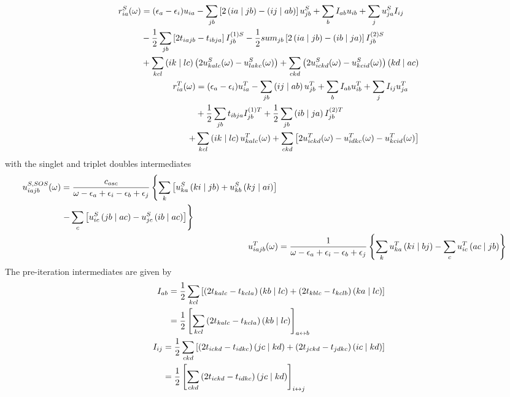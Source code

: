\begin{align}
\begin{split}
r_{ia}^S(\omega) &= (\epsilon_a - \epsilon_i) u_{ia} - \sum_{jb} \left[ 2\left( ia \mid jb \right) - \left( ij \mid ab \right) \right] u_{jb}^S + \sum_b I_{ab} u_{ib} + \sum_j u_{ja}^S I_{ij} \\
&- \frac{1}{2} \sum_{jb} \left[2t_{iajb} - t_{ibja}\right] I^{(1)S}_{jb} - \frac{1}{2} sum_{jb} \left[ 2 \left( ia \mid jb \right) - \left( ib \mid ja \right) \right] I^{(2)S}_{jb} \\
&+ \sum_{kcl} \left( ik \mid lc \right) \left( 2 u_{kalc}^S(\omega) - u_{lakc}^S(\omega) \right) + \sum_{ckd} \left( 2 u^S_{ickd}(\omega) - u^S_{kcid}(\omega) \right) \left( kd \mid ac \right)  
\end{split}
\label{eq:SPINADCS}
\\
\begin{split}
r_{ia}^T(\omega) &= (\epsilon_a - \epsilon_i) u_{ia}^T - \sum_{jb} \left( ij \mid ab \right) u_{jb}^T + \sum_b I_{ab} u_{ib}^T + \sum_j I_{ij} u_{ja}^T \\
&+ \frac{1}{2} \sum_{jb} t_{ibja} I^{(1)T}_{jb} + \frac{1}{2} \sum_{jb} \left( ib \mid ja \right) I^{(2)T}_{jb} \\
+& \sum_{kcl} \left( ik \mid lc \right) u^T_{kalc}(\omega) + \sum_{ckd} \left[ 2 u^T_{ickd}(\omega) - u^T_{idkc}(\omega) - u^T_{kcid}(\omega) \right] 
\end{split}
\label{eq:SPINADCT}
\end{align}
\noindent with the singlet and triplet doubles intermediates
\begin{align}
\begin{split}
u^{S,SOS}_{iajb}(\omega) &= \frac{c_{osc}}{\omega - \epsilon_a + \epsilon_i - \epsilon_b + \epsilon_j} \left\lbrace \sum_k \left[ u^S_{ka} \left( ki \mid jb \right) + u^S_{kb} \left( kj \mid ai \right) \right] \right. \\
&\left. - \sum_c \left[ u^S_{ic} \left( jb \mid ac \right) - u^S_{jc} \left( ib \mid ac \right) \right] \right\rbrace
\end{split} 
\\
u^T_{iajb}(\omega) &= \frac{1}{\omega - \epsilon_a + \epsilon_i - \epsilon_b + \epsilon_j} \left\lbrace \sum_k u^T_{ka} \left( ki \mid bj \right) - \sum_c u^T_{ic} \left( ac \mid jb \right) \right\rbrace
\end{align}
\noindent The pre-iteration intermediates are given by
\begin{align}
\begin{split}
I_{ab} &= \frac{1}{2} \sum_{kcl} \left[ \left( 2t_{kalc} - t_{kcla}\right) \left( kb \mid lc \right) + \left( 2t_{kblc} - t_{kclb} \right) \left( ka \mid lc \right) \right] \\
&= \frac{1}{2} \left[ \sum_{kcl} \left( 2t_{kalc} - t_{kcla}\right) \left( kb \mid lc \right) \right]_{a \leftrightarrow b}
\end{split}
\\
\begin{split}
I_{ij} &= \frac{1}{2} \sum_{ckd} \left[ \left( 2t_{ickd} - t_{idkc}\right) \left( jc \mid kd \right) + \left( 2t_{jckd} - t_{jdkc} \right) \left( ic \mid kd \right) \right] \\
&= \frac{1}{2} \left[ \sum_{ckd} \left( 2t_{ickd} - t_{idkc}\right) \left( jc \mid kd \right) \right]_{i \leftrightarrow j}
\end{split}
\end{align}

